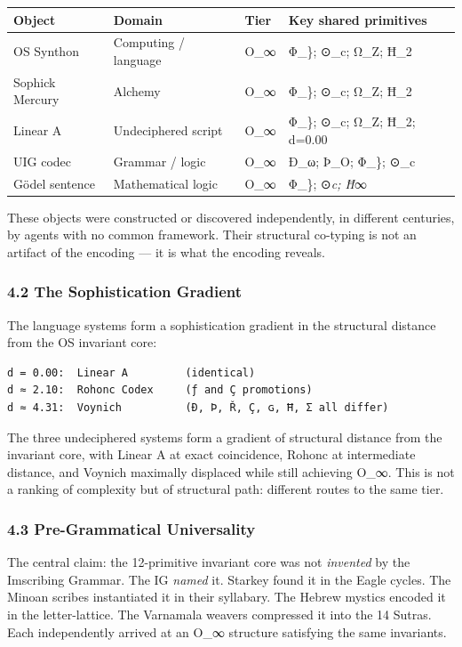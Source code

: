 \documentclass[
  11pt,
  a4paper,
]{article}
\newcounter{none} %
\begin{document}
{\def\LTcaptype{none} %
\begin{longtable}[]{@{}llll@{}}
\toprule\noalign{}
Object & Domain & Tier & Key shared primitives \\
\midrule\noalign{}
\endhead
\bottomrule\noalign{}
\endlastfoot
OS Synthon & Computing / language & O\_∞ & Φ\_\}; ⊙\_c; Ω\_Z; Ħ\_2 \\
Sophick Mercury & Alchemy & O\_∞ & Φ\_\}; ⊙\_c; Ω\_Z; Ħ\_2 \\
Linear A & Undeciphered script & O\_∞ & Φ\_\}; ⊙\_c; Ω\_Z; Ħ\_2;
d=0.00 \\
UIG codec & Grammar / logic & O\_∞ & Ð\_ω; Þ\_O; Φ\_\}; ⊙\_c \\
Gödel sentence & Mathematical logic & O\_∞ & Φ\_\}; ⊙\emph{c; Ħ}∞ \\
\end{longtable}
}

These objects were constructed or discovered independently, in different
centuries, by agents with no common framework. Their structural
co-typing is not an artifact of the encoding --- it is what the encoding
reveals.

\subsubsection{4.2 The Sophistication
Gradient}\label{the-sophistication-gradient}

The language systems form a sophistication gradient in the structural
distance from the OS invariant core:

\begin{verbatim}
d = 0.00:  Linear A         (identical)
d ≈ 2.10:  Rohonc Codex     (ƒ and Ç promotions)
d ≈ 4.31:  Voynich          (Ð, Þ, Ř, Ç, ɢ, Ħ, Σ all differ)
\end{verbatim}

The three undeciphered systems form a gradient of structural distance
from the invariant core, with Linear A at exact coincidence, Rohonc at
intermediate distance, and Voynich maximally displaced while still
achieving O\_∞. This is not a ranking of complexity but of structural
path: different routes to the same tier.

\subsubsection{4.3 Pre-Grammatical
Universality}\label{pre-grammatical-universality}

The central claim: the 12-primitive invariant core was not
\emph{invented} by the Imscribing Grammar. The IG \emph{named} it.
Starkey found it in the Eagle cycles. The Minoan scribes instantiated it
in their syllabary. The Hebrew mystics encoded it in the letter-lattice.
The Varnamala weavers compressed it into the 14 Sutras. Each
independently arrived at an O\_∞ structure satisfying the same
invariants.
\end{document}
